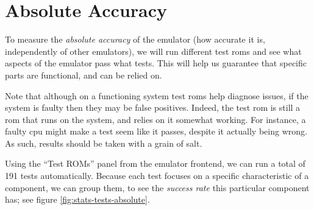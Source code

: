 \documentclass[11pt]{informatics-report}
\begin{document}
\section{Absolute Accuracy}

To measure the \textit{absolute accuracy} of the emulator (how accurate it is, independently of other emulators), we will run different test \glspl{rom} and see what aspects of the emulator pass what tests. This will help us guarantee that specific parts are functional, and can be relied on.

Note that although on a functioning system test \glspl{rom} help diagnose issues, if the system is faulty then they may be false positives. Indeed, the test \gls{rom} is still a \gls{rom} that runs on the system, and relies on it somewhat working. For instance, a faulty \gls{cpu} might make a test seem like it passes, despite it actually being wrong. As such, results should be taken with a grain of salt.

Using the ``Test ROMs'' panel from the emulator frontend, we can run a total of 191 tests automatically. Because each test focuses on a specific characteristic of a component, we can group them, to see the \textit{success rate} this particular component has; see figure \ref{fig:stats-tests-absolute}.
\end{document}
